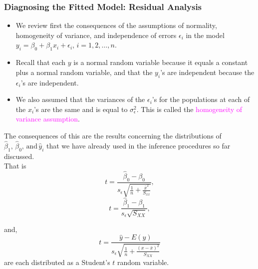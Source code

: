 \documentclass[xcolor=dvipsnames,12pt]{beamer}
\begin{document}
\begin{frame}
\frametitle{Diagnosing the Fitted Model: Residual Analysis}
\begin{itemize}
\item We review first the consequences of the assumptions of normality,
homogeneity of variance, and independence of errors $\epsilon_i$
in the model $y_i = \beta_0 + \beta_1x_i + \epsilon_i$,
$i=1,2,\ldots,n$.\\[.05in]
\item Recall that each $y$ is a  normal random variable because it equals
a constant plus a normal random variable, and that the $y_i$'s are independent
because the $\epsilon_i$'s are independent. \\[.05in]
\item We also assumed that the
variances of the $\epsilon_i$'s for the populations at each of the
$x_i$'s  are the same and is equal to  $\sigma_\epsilon^2$. This is
called the \textcolor{magenta}{homogeneity of variance assumption}. \\[.05in]
\end{itemize}
\end{frame}


\begin{frame}
The consequences of this are the results concerning the
distributions of 
$\hat{\beta}_1,\,\hat{\beta}_0,\, \mbox{and}\, \hat{y}_i $
that  we have already used in the  inference procedures so far discussed.\\[.1in]
That is
          $$t = \frac{\hat{\beta}_0-\beta_0}{s_\epsilon
\sqrt{\frac1n + \frac{\bar{x}^2}{S_{xx}}}},$$
$$ t = \frac{\hat{\beta}_1 - \beta_1}{s_\epsilon \sqrt{S_{XX}}},$$

and,
        $$
         t = \frac{\hat{y}-E(y)}{s_\epsilon \sqrt{\frac1n +
         \frac{(x-\bar{x})^2}{S_{XX}}}}
        $$
are each distributed as a Student's $t$ random variable.
\end{frame}
\end{document}

